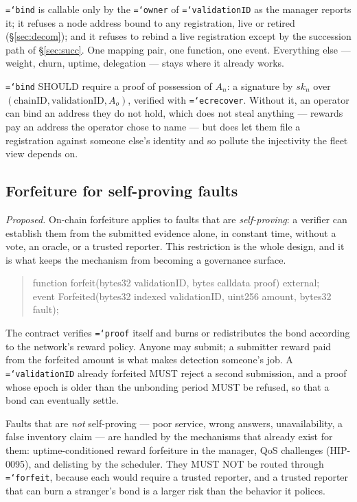 \documentclass[11pt,a4paper]{article}
\newcommand{\code}[1]{\texttt{\hyphenchar\font=`\-\relax #1}}
\begin{document}
\code{bind} is callable only by the \code{owner} of \code{validationID} as the
manager reports it; it refuses a node address bound to any registration, live or
retired (\S\ref{sec:decom}); and it refuses to rebind a live registration except
by the succession path of \S\ref{sec:succ}. One mapping pair, one function, one
event. Everything else --- weight, churn, uptime, delegation --- stays where it
already works.

\code{bind} SHOULD require a proof of possession of $A_n$: a signature by $sk_n$
over $(\text{chainID}, \text{validationID}, A_o)$, verified with
\code{ecrecover}. Without it, an operator can bind an address they do not hold,
which does not steal anything --- rewards pay an address the operator chose to
name --- but does let them file a registration against someone else's identity and
so pollute the injectivity the fleet view depends on.

\subsection{Forfeiture for self-proving faults}
\label{sec:forfeit}

\emph{Proposed.} On-chain forfeiture applies to faults that are
\emph{self-proving}: a verifier can establish them from the submitted evidence
alone, in constant time, without a vote, an oracle, or a trusted reporter. This
restriction is the whole design, and it is what keeps the mechanism from becoming
a governance surface.

\begin{quote}\ttfamily
function forfeit(bytes32 validationID, bytes calldata proof) external;\\
event Forfeited(bytes32 indexed validationID, uint256 amount, bytes32 fault);
\end{quote}

The contract verifies \code{proof} itself and burns or redistributes the bond
according to the network's reward policy. Anyone may submit; a submitter reward
paid from the forfeited amount is what makes detection someone's job. A
\code{validationID} already forfeited MUST reject a second submission, and a proof
whose epoch is older than the unbonding period MUST be refused, so that a bond can
eventually settle.

Faults that are \emph{not} self-proving --- poor service, wrong answers,
unavailability, a false inventory claim --- are handled by the mechanisms that
already exist for them: uptime-conditioned reward forfeiture in the manager, QoS
challenges (HIP-0095), and delisting by the scheduler. They MUST NOT be routed
through \code{forfeit}, because each would require a trusted reporter, and a
trusted reporter that can burn a stranger's bond is a larger risk than the
behavior it polices.
\end{document}
